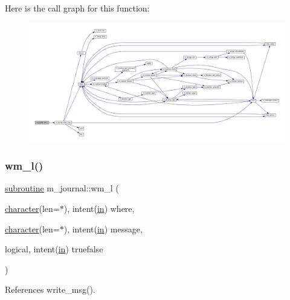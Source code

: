 Here is the call graph for this function\+:
\nopagebreak
\begin{figure}[H]
\begin{center}
\leavevmode
\includegraphics[width=350pt]{namespacem__journal_a931487b48fc9268afb0c286c3c3892ad_cgraph}
\end{center}
\end{figure}
\mbox{\label{namespacem__journal_a3229165c77bc7f39fbf88fbcfbdb401e}} 
\subsubsection{\texorpdfstring{wm\+\_\+l()}{wm\_l()}}
{\footnotesize\ttfamily \hyperlink{M__stopwatch_83_8txt_acfbcff50169d691ff02d4a123ed70482}{subroutine} m\+\_\+journal\+::wm\+\_\+l (\begin{DoxyParamCaption}\item[{\hyperlink{option__stopwatch_83_8txt_abd4b21fbbd175834027b5224bfe97e66}{character}(len=$\ast$), intent(\hyperlink{M__journal_83_8txt_afce72651d1eed785a2132bee863b2f38}{in})}]{where,  }\item[{\hyperlink{option__stopwatch_83_8txt_abd4b21fbbd175834027b5224bfe97e66}{character}(len=$\ast$), intent(\hyperlink{M__journal_83_8txt_afce72651d1eed785a2132bee863b2f38}{in})}]{message,  }\item[{logical, intent(\hyperlink{M__journal_83_8txt_afce72651d1eed785a2132bee863b2f38}{in})}]{truefalse }\end{DoxyParamCaption})\hspace{0.3cm}{\ttfamily [private]}}



References write\+\_\+msg().

